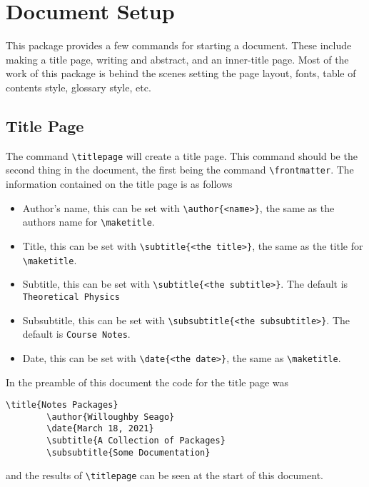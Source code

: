 \documentclass[fleqn, a4paper, openany]{memoir}
\begin{document}
    \section{Document Setup}
    This package provides a few commands for starting a document.
    These include making a title page, writing and abstract, and an inner-title page.
    Most of the work of this package is behind the scenes setting the page layout, fonts, table of contents style, glossary style, etc.
    
    \subsection{Title Page}
    The command \verb!\titlepage! will create a title page. This command should be the second thing in the document, the first being the command \verb!\frontmatter!.
    The information contained on the title page is as follows
    \begin{itemize}
        \item Author's name, this can be set with \verb!\author{<name>}!, the same as the authors name for \verb!\maketitle!.
        \item Title, this can be set with \verb!\subtitle{<the title>}!, the same as the title for \verb!\maketitle!.
        \item Subtitle, this can be set with \verb!\subtitle{<the subtitle>}!. The default is \verb!Theoretical Physics!
        \item Subsubtitle, this can be set with \verb!\subsubtitle{<the subsubtitle>}!. The default is \verb!Course Notes!.
        \item Date, this can be set with \verb!\date{<the date>}!, the same as \verb!\maketitle!.
    \end{itemize}
    In the preamble of this document the code for the title page was
    \begin{Verbatim}[gobble=2]
        \title{Notes Packages}
        \author{Willoughby Seago}
        \date{March 18, 2021}
        \subtitle{A Collection of Packages}
        \subsubtitle{Some Documentation}
    \end{Verbatim}
    and the results of \verb!\titlepage! can be seen at the start of this document.
\end{document}
